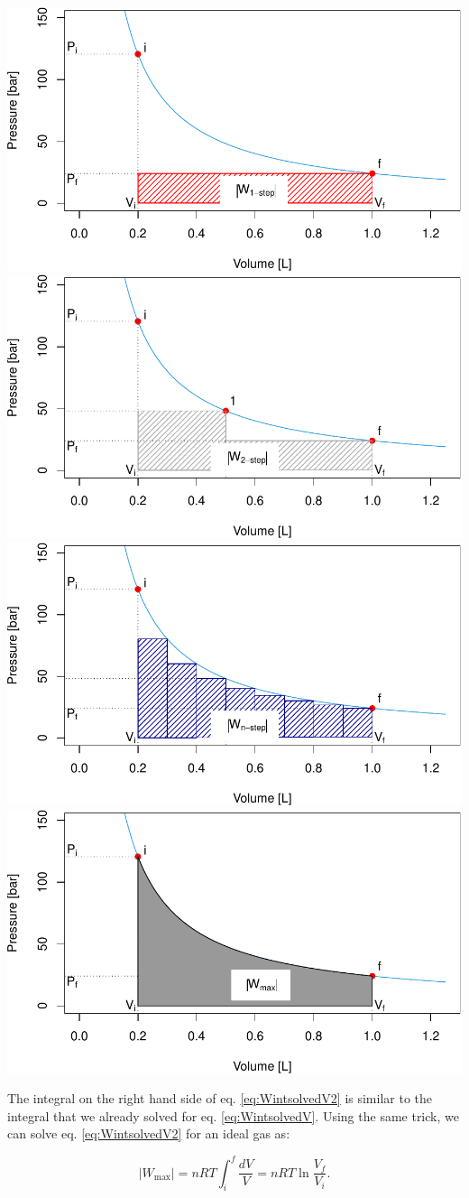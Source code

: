 \documentclass[
]{book}
\theoremstyle{definition}
\theoremstyle{definition}
\theoremstyle{definition}
\theoremstyle{remark}
\begin{document}
\includegraphics[width=0.5\linewidth,height=1\textheight]{Pchem1_files/figure-latex/figures-side-1} \includegraphics[width=0.5\linewidth,height=1\textheight]{Pchem1_files/figure-latex/figures-side-2} \includegraphics[width=0.5\linewidth,height=1\textheight]{Pchem1_files/figure-latex/figures-side-3} \includegraphics[width=0.5\linewidth,height=1\textheight]{Pchem1_files/figure-latex/figures-side-4}

The integral on the right hand side of eq. \eqref{eq:WintsolvedV2} is similar to the integral that we already solved for eq. \eqref{eq:WintsolvedV}. Using the same trick, we can solve eq. \eqref{eq:WintsolvedV2} for an ideal gas as:

\begin{equation}
  \left| W_{\text{max}} \right| = nRT \int_{i}^{f} \frac{dV}{V} = nRT \ln \frac{V_f}{V_i}.
  \label{eq:WmaxV}
\end{equation}
\end{document}
